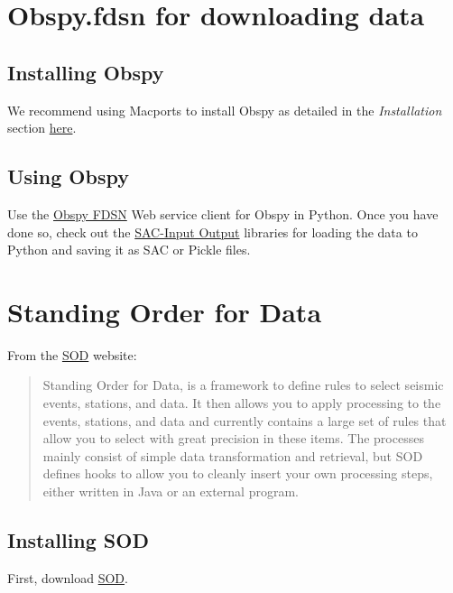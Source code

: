 \documentclass[letterpaper,10pt,english]{sphinxmanual}
\begin{document}
\section{Obspy.fdsn for downloading data}
\label{docfiles/gettingData:obspy-fdsn-for-downloading-data}

\subsection{Installing Obspy}
\label{docfiles/gettingData:installing-obspy}
We recommend using Macports to install Obspy as detailed in the \emph{Installation} section \href{https://github.com/obspy/obspy/wiki}{here}.


\subsection{Using Obspy}
\label{docfiles/gettingData:using-obspy}
Use the \href{http://docs.obspy.org/packages/obspy.fdsn.html\#}{Obspy FDSN} Web service client for Obspy in Python. Once you have done so, check out the \href{http://docs.obspy.org/packages/obspy.sac.html}{SAC-Input Output} libraries for loading the data to Python and saving it as SAC or Pickle files.


\section{Standing Order for Data}
\label{docfiles/gettingData:standing-order-for-data}
From the \href{http://www.seis.sc.edu/index.html}{SOD} website:
\begin{quote}

Standing Order for Data, is a framework to define rules to select seismic events, stations, and data. It then allows you to apply processing to the events, stations, and data and currently contains a large set of rules that allow you to select with great precision in these items. The processes mainly consist of simple data transformation and retrieval, but SOD defines hooks to allow you to cleanly insert your own processing steps, either written in Java or an external program.
\end{quote}


\subsection{Installing SOD}
\label{docfiles/gettingData:installing-sod}
First, download \href{http://www.seis.sc.edu/index.html}{SOD}.
\end{document}
